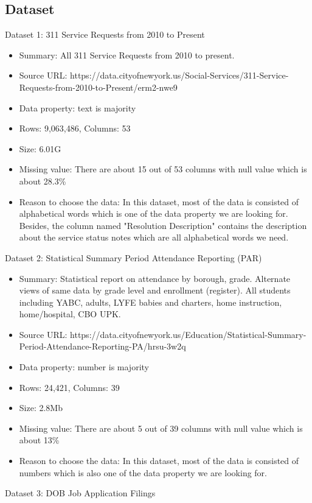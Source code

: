 \documentclass[sigconf]{acmart}
\begin{document}
\subsection{Dataset}
Dataset 1: 311 Service Requests from 2010 to Present
\begin{itemize}
	\item{Summary: All 311 Service Requests from 2010 to present.}
	\item{Source URL: https://data.cityofnewyork.us/Social-Services/311-Service-Requests-from-2010-to-Present/erm2-nwe9}
	\item{Data property: text is majority}
	\item{Rows: 9,063,486, Columns: 53}
	\item{Size: 6.01G}
	\item{Missing value: There are about 15 out of 53 columns with null value which is about 28.3\%}
	\item{Reason to choose the data: In this dataset, most of the data is consisted of alphabetical words which is one of the data property we are looking for. Besides, the column named "Resolution Description" contains the description about the service status notes which are all alphabetical words we need. }
\end{itemize}
Dataset 2: Statistical Summary Period Attendance Reporting (PAR)
\begin{itemize}
	\item{Summary: Statistical report on attendance by borough, grade. Alternate views of same data by grade level and enrollment (register). All students including YABC, adults, LYFE babies and charters, home instruction, home/hospital, CBO UPK.}
	\item{Source URL: https://data.cityofnewyork.us/Education/Statistical-Summary-Period-Attendance-Reporting-PA/hrsu-3w2q}
	\item{Data property: number is majority}
	\item{Rows: 24,421, Columns: 39}
	\item{Size: 2.8Mb}
	\item{Missing value: There are about 5 out of 39 columns with null value which is about 13\%}
	\item{Reason to choose the data: In this dataset, most of the data is consisted of numbers which is also one of the data property we are looking for.}
\end{itemize}
Dataset 3: DOB Job Application Filings
\end{document}
